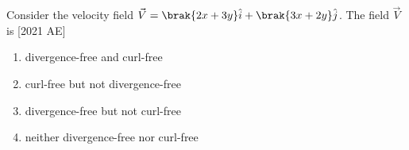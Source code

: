 \item Consider the velocity field $\vec{V} = \brak{2x + 3y}\hat{i} + \brak{3x + 2y} \hat{j}$. The field $\vec{V}$ is \hfill [2021 AE]
\begin{enumerate}
    \item divergence-free and curl-free
    \item curl-free but not divergence-free
    \item divergence-free but not curl-free
    \item neither divergence-free nor curl-free
\end{enumerate}

